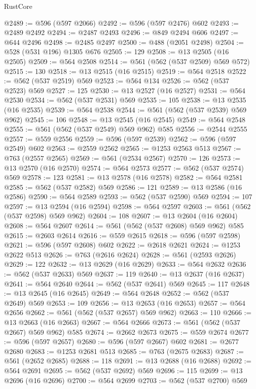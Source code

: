 \begin{lexlean}{RustCore}
\begin{coremodule}
@2489 := @596 (@597 @2066)
@2492 := @596 (@597 @2476) @602
@2493 := @2489 @2492
@2494 := @2487 @2493
@2496 := @849 @2494 @606
@2497 := @644 @2496
@2498 := @2485 @2497
@2500 := @488 (@2051 @2498)
@2504 := @528 (@531 @196) @1305 @676
@2505 := 129
@2508 := @13 @2505 (@16 @2505)
@2509 := @564 @2508
@2514 := @561 (@562 (@537 @2509) @569 @572)
@2515 := 130
@2518 := @13 @2515 (@16 @2515)
@2519 := @564 @2518
@2522 := @562 (@537 @2519) @569
@2523 := @564 @134
@2526 := @562 (@537 @2523) @569
@2527 := 125
@2530 := @13 @2527 (@16 @2527)
@2531 := @564 @2530
@2534 := @562 (@537 @2531) @569
@2535 := 105
@2538 := @13 @2535 (@16 @2535)
@2539 := @564 @2538
@2544 := @561 (@562 (@537 @2539) @569 @962)
@2545 := 106
@2548 := @13 @2545 (@16 @2545)
@2549 := @564 @2548
@2555 := @561 (@562 (@537 @2549) @569 @962) @585
@2556 := @2544 @2555
@2557 := @559 @2556
@2559 := @596 (@597 @2539)
@2562 := @596 (@597 @2549) @602
@2563 := @2559 @2562
@2565 := @1253 @2563 @513
@2567 := @763 (@2557 @2565)
@2569 := @561 (@2534 @2567)
@2570 := 126
@2573 := @13 @2570 (@16 @2570)
@2574 := @564 @2573
@2577 := @562 (@537 @2574) @569
@2578 := 123
@2581 := @13 @2578 (@16 @2578)
@2582 := @564 @2581
@2585 := @562 (@537 @2582) @569
@2586 := 121
@2589 := @13 @2586 (@16 @2586)
@2590 := @564 @2589
@2593 := @562 (@537 @2590) @569
@2594 := 107
@2597 := @13 @2594 (@16 @2594)
@2598 := @564 @2597
@2603 := @561 (@562 (@537 @2598) @569 @962)
@2604 := 108
@2607 := @13 @2604 (@16 @2604)
@2608 := @564 @2607
@2614 := @561 (@562 (@537 @2608) @569 @962) @585
@2615 := @2603 @2614
@2616 := @559 @2615
@2618 := @596 (@597 @2598)
@2621 := @596 (@597 @2608) @602
@2622 := @2618 @2621
@2624 := @1253 @2622 @513
@2626 := @763 (@2616 @2624)
@2628 := @561 (@2593 @2626)
@2629 := 122
@2632 := @13 @2629 (@16 @2629)
@2633 := @564 @2632
@2636 := @562 (@537 @2633) @569
@2637 := 119
@2640 := @13 @2637 (@16 @2637)
@2641 := @564 @2640
@2644 := @562 (@537 @2641) @569
@2645 := 117
@2648 := @13 @2645 (@16 @2645)
@2649 := @564 @2648
@2652 := @562 (@537 @2649) @569
@2653 := 109
@2656 := @13 @2653 (@16 @2653)
@2657 := @564 @2656
@2662 := @561 (@562 (@537 @2657) @569 @962)
@2663 := 110
@2666 := @13 @2663 (@16 @2663)
@2667 := @564 @2666
@2673 := @561 (@562 (@537 @2667) @569 @962) @585
@2674 := @2662 @2673
@2675 := @559 @2674
@2677 := @596 (@597 @2657)
@2680 := @596 (@597 @2667) @602
@2681 := @2677 @2680
@2683 := @1253 @2681 @513
@2685 := @763 (@2675 @2683)
@2687 := @561 (@2652 @2685)
@2688 := 118
@2691 := @13 @2688 (@16 @2688)
@2692 := @564 @2691
@2695 := @562 (@537 @2692) @569
@2696 := 115
@2699 := @13 @2696 (@16 @2696)
@2700 := @564 @2699
@2703 := @562 (@537 @2700) @569

\end{coremodule}
\end{lexlean}
